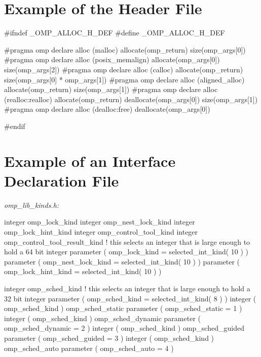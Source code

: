 \section{Example of the  Header File}
\label{sec:Example of the omp_alloc.h Header File}
{\small \begin{codepar}
\#ifndef \_OMP\_ALLOC\_H\_DEF
\#define \_OMP\_ALLOC\_H\_DEF

\#pragma omp declare alloc (malloc) allocate(omp_return) size(omp_args[0])
\#pragma omp declare alloc (posix_memalign)  allocate(omp_args[0]) size(omp_args[2])
\#pragma omp declare alloc (calloc) allocate(omp_return) size(omp_args[0] * omp_args[1])
\#pragma omp declare alloc (aligned_alloc) allocate(omp_return) size(omp_args[1])
\#pragma omp declare alloc (realloc:realloc) allocate(omp_return) deallocate(omp_args[0]) size(omp_args[1]) 
\#pragma omp declare alloc (dealloc:free) deallocate(omp_args[0])

\#endif
\end{codepar}


\pagebreak
{\section{Example of an Interface Declaration  File}}
\label{sec:Example of an Interface Declaration include File}
\emph{omp\_lib\_kinds.h:}
{\small \begin{codepar}

     integer omp\_lock\_kind
     integer omp\_nest\_lock\_kind
     integer omp\_lock\_hint\_kind
     integer omp\_control\_tool\_kind
     integer omp\_control\_tool\_result\_kind
! this selects an integer that is large enough to hold a 64 bit integer
     parameter ( omp\_lock\_kind = selected\_int\_kind( 10 ) )
     parameter ( omp\_nest\_lock\_kind = selected\_int\_kind( 10 ) )
     parameter ( omp\_lock\_hint\_kind = selected\_int\_kind( 10 ) )
     
     integer omp\_sched\_kind
! this selects an integer that is large enough to hold a 32 bit integer
     parameter ( omp\_sched\_kind = selected\_int\_kind( 8 ) )
     integer ( omp\_sched\_kind ) omp\_sched\_static
     parameter ( omp\_sched\_static = 1 )
     integer ( omp\_sched\_kind ) omp\_sched\_dynamic
     parameter ( omp\_sched\_dynamic = 2 )
     integer ( omp\_sched\_kind ) omp\_sched\_guided
     parameter ( omp\_sched\_guided = 3 )
     integer ( omp\_sched\_kind ) omp\_sched\_auto
     parameter ( omp\_sched\_auto = 4 )
     

\end{codepar}}}
